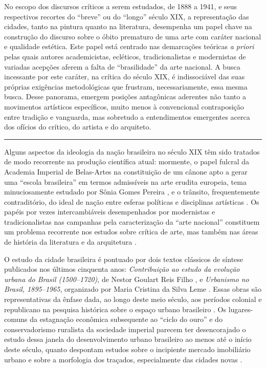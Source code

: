 No escopo dos discursos críticos a serem estudados, de 1888 a 1941, e
seus respectivos recortes do ``breve'' ou do ``longo'' século XIX, a
representação das cidades, tanto na pintura quanto na literatura,
desempenha um papel chave na construção do discurso sobre o óbito
prematuro de uma arte com caráter nacional e qualidade estética. Este
papel está centrado nas demarcações teóricas \emph{a priori} pelas quais
autores academicistas, ecléticos, tradicionalistas e modernistas de
variadas acepções aferem a falta de ``brasilidade'' da arte nacional. A
busca incessante por este caráter, na crítica do século XIX, é
indissociável das suas próprias exigências metodológicas que frustram,
necessariamente, essa mesma busca. Desse panorama, emergem posições
antagônicas aderentes não tanto a movimentos artísticos específicos,
muito menos à convencional contraposição entre tradição e vanguarda, mas
sobretudo a entendimentos emergentes acerca dos ofícios do crítico, do
artista e do arquiteto.

\begin{center}\rule{0.5\linewidth}{0.5pt}\end{center}

Alguns aspectos da ideologia da nação brasileira no século XIX têm sido
tratados de modo recorrente na produção científica atual: mormente, o
papel fulcral da Academia Imperial de Belas-Artes na constituição de um
cânone apto a gerar uma ``escola brasileira'' em termos admissíveis na
arte erudita europeia, tema minuciosamente estudado por Sônia Gomes
Pereira \autocite{pereira:2012revisao}, e o trânsito, frequentemente
contraditório, do ideal de nação entre esferas políticas e disciplinas
artísticas \autocite{abreu:2001museu}. Os papéis por vezes
intercambiáveis desempenhados por modernistas e tradicionalistas nas
campanhas pela caracterização da ``arte nacional'' constituem um
problema recorrente nos estudos sobre crítica de arte, mas também nas
áreas de história da literatura e da arquitetura
\autocite{lins:1996gonzaga25,thiengo:2010questao,wisnik:2007plastica}.

O estudo da cidade brasileira é pontuado por dois textos clássicos de
síntese publicados nos últimos cinquenta anos: \emph{Contribuição ao
estudo da evolução urbana do Brasil (1500--1720)}, de Nestor Goulart
Reis Filho \autocite*{reisfilho:1968contribuicao}, e \emph{Urbanismo no
Brasil, 1895--1965}, organizado por Maria Cristina da Silva Leme
\autocite*{leme:2005urbanismo}. Essas obras são representativas da
ênfase dada, ao longo deste meio século, aos períodos colonial e
republicano na pesquisa histórica sobre o espaço urbano brasileiro
\autocite{fernandes:2004historia}. Os lugares-comuns da estagnação
econômica subsequente ao ``ciclo do ouro'' e do conservadorismo
ruralista da sociedade imperial parecem ter desencorajado o estudo dessa
janela do desenvolvimento urbano brasileiro ao menos até o início deste
século, quanto despontam estudos sobre o incipiente mercado imobiliário
urbano \autocite{bueno:2005tecido} e sobre a morfologia dos traçados,
especialmente das cidades novas
\autocite{brazesilva:2012planejamento13,nogueira:2013analise}.

